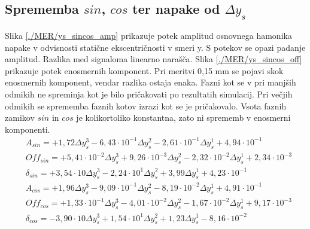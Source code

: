 \subsection{Sprememba $sin$, $cos$ ter napake od $\Delta y_s$}
Slika \ref{./MER/ys_sincos_amp} prikazuje potek amplitud osnovnega hamonika napake v odvisnosti statične ekscentričnosti v smeri y. S potekov se opazi padanje amplitud. Razlika med signaloma linearno narašča. 
Slika \ref{./MER/ys_sincos_off} prikazuje potek enosmernih komponent. Pri meritvi 0,15 mm se pojavi skok enosmernih komponent, vendar razlika ostaja enaka.
Fazni kot se v pri manjših odmikih ne spreminja kot je bilo pričakovati po rezultatih simulacij. Pri večjih odmikih se sprememba faznih kotov izrazi kot se je pričakovalo. Vsota faznih zamikov $sin$ in $cos$ je kolikortoliko konstantna, zato ni sprememb v enosmerni komponenti.
\begin{eqnarray}
&A_{sin} = +1,72            \Delta y_s^3-6,43\cdot 10^{-1}\Delta y_s^2-2,61\cdot 10^{-1}\Delta y_s^1+4,94\cdot 10^{-1}            \\   
&Off_{sin} = +5,41\cdot 10^{-2}\Delta y_s^3+9,26\cdot 10^{-3}\Delta y_s^2-2,32\cdot 10^{-2}\Delta y_s^1+2,34\cdot 10^{-3}            \\
&\delta_{sin} = +3,54\cdot 10    \Delta y_s^3-2,24\cdot 10^{1}\Delta y_s^2+3,99            \Delta y_s^1+4,23\cdot 10^{-1}            \\
&A_{cos} = +1,96            \Delta y_s^3-9,09\cdot 10^{-1}\Delta y_s^2-8,19\cdot 10^{-2}\Delta y_s^1+4,91\cdot 10^{-1}            \\   
&Off_{cos} = +1,33\cdot 10^{-1}\Delta y_s^3-4,01\cdot 10^{-2}\Delta y_s^2-1,67\cdot 10^{-2}\Delta y_s^1+9,17\cdot 10^{-3}            \\
&\delta_{cos} = -3,90\cdot 10    \Delta y_s^3+1,54\cdot 10^{1}\Delta y_s^2+1,23            \Delta y_s^1-8,16\cdot 10^{-2}
\end{eqnarray}

